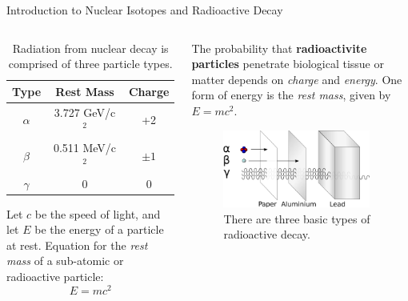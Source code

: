 \documentclass{beamer}
\begin{document}
\begin{frame}{Introduction to Nuclear Isotopes and Radioactive Decay}
\small
\begin{columns}[T]
\begin{column}{0.5\textwidth}
\begin{table}
\centering
\begin{tabular}{| c | c | c |}
\hline
Type & Rest Mass & Charge \\ \hline
$\alpha$ & 3.727 GeV/c$^2$ & +2 \\ \hline
$\beta$ & 0.511 MeV/c$^2$ & $\pm 1$ \\ \hline
$\gamma$ & 0 & 0 \\ \hline
\end{tabular}
\caption{\label{tab:radio} Radiation from nuclear decay is comprised of three particle types.}
\end{table}
Let $c$ be the speed of light, and let $E$ be the energy of a particle at rest.  Equation for the \textit{rest mass} of a sub-atomic or radioactive particle:
\begin{equation}
E = mc^2
\end{equation}
\end{column}
\begin{column}{0.5\textwidth}
The probability that \textbf{\alert{radioactivite particles}} penetrate biological tissue or matter depends on \textit{charge} and \textit{energy}.  One form of energy is the \textit{rest mass}, given by $E = mc^2$.
\begin{figure}
\centering
\includegraphics[width=0.95\textwidth]{figures/radioactivity.png}
\caption{\label{fig:radio6} There are three basic types of radioactive decay.}
\end{figure}
\end{column}
\end{columns}
\end{frame}
\end{document}
